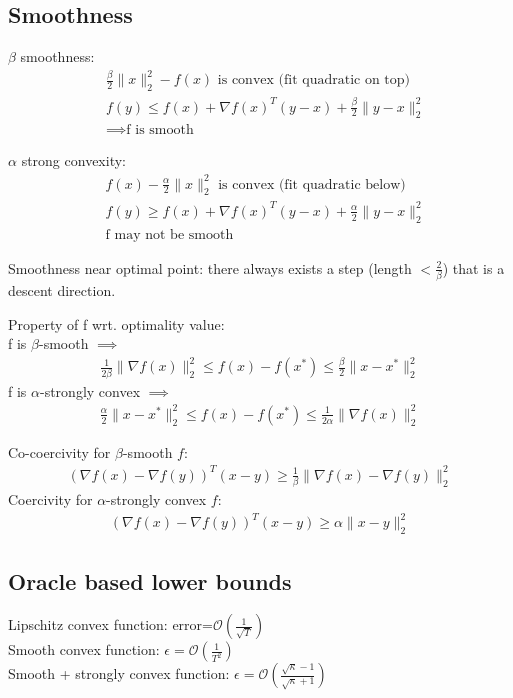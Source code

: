 \documentclass[8pt,letter]{article}
\begin{document}
\begin{multicols*}{2}
  \vfill\null
  \pagebreak
    
  \section{Smoothness}
  $\beta$ smoothness:
  \begin{align*}
    & \frac{\beta}{2} \|x\|_2^2 - f(x) \text{ is convex (fit quadratic on top)}\\
    & f(y) \leq f(x) + \nabla f(x)^T (y-x) + \frac{\beta}{2} \|y-x\|_2^2\\
    & \implies \text{f is smooth}
  \end{align*}

  $\alpha$ strong convexity:
  \begin{align*}
    & f(x) - \frac{\alpha}{2} \|x\|_2^2 \text{ is convex (fit quadratic below)}\\
    & f(y) \geq f(x) + \nabla f(x)^T (y-x) + \frac{\alpha}{2} \|y-x\|_2^2\\
    & \text{f may not be smooth}
  \end{align*}

  Smoothness near optimal point: there always exists a step (length $<\frac{2}{\beta}$) that is a descent direction.

  Property of f wrt. optimality value:\\
  f is $\beta$-smooth $\implies$
  \begin{align*}
    \frac{1}{2 \beta} \|\nabla f(x) \|_2^2 \leq f(x) -f(x^*) \leq \frac{\beta}{2} \| x-x^* \|_2^2
  \end{align*}
  f is $\alpha$-strongly convex $\implies$
  \begin{align*}
    \frac{\alpha}{2} \| x-x^* \|_2^2 \leq f(x) -f(x^*) \leq \frac{1}{2 \alpha} \|\nabla f(x) \|_2^2
  \end{align*}

  Co-coercivity for $\beta$-smooth $f$:
  \begin{align*}
    \left(\nabla f(x) - \nabla f(y)\right)^T(x-y) \geq \frac{1}{\beta} \|\nabla f(x) - \nabla f(y)\|_2^2
  \end{align*}
  Coercivity for $\alpha$-strongly convex $f$:
  \begin{align*}
    \left(\nabla f(x) - \nabla f(y)\right)^T(x-y) \geq \alpha \|x - y\|_2^2
  \end{align*}
  
  \subsection {Oracle based lower bounds}
  Lipschitz convex function: error=$\mathcal{O}(\frac{1}{\sqrt{T}})$\\
  Smooth convex function: $\epsilon=\mathcal{O}(\frac{1}{T^2})$\\
  Smooth + strongly convex function: $\epsilon=\mathcal{O}(\frac{\sqrt{\kappa}-1}{\sqrt{\kappa}+1})$


\end{multicols*}
\end{document}
